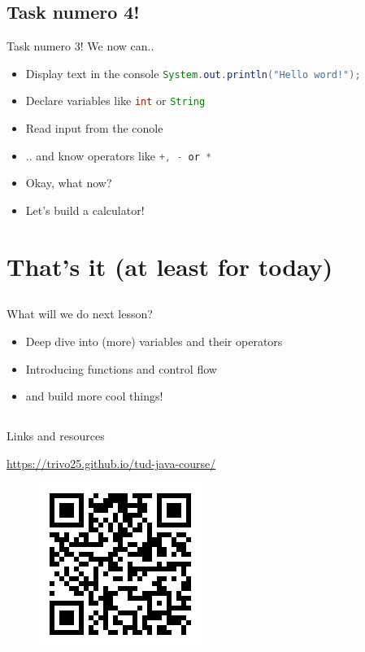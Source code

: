 \subsection{Task numero 4!}
\begin{frame}[fragile]{Task numero 3!}
	We now can..
	\begin{itemize}[<+->]
		\item Display text in the console \lstinline[language=Java]{System.out.println("Hello word!");}
		\item Declare variables like \lstinline[language=Java]{int} or \lstinline[language=Java]{String}
		\item Read input from the conole
		\item .. and know operators like \lstinline[language=Java]{+, - or *}
		\item[] Okay, what now?
		\item[] Let's build a calculator!
	\end{itemize}
\end{frame}

\section{That's it (at least for today)}

\subsection{}
\begin{frame}{What will we do next lesson?}
	\begin{itemize}
		\item Deep dive into (more) variables and their operators
		\item Introducing functions and control flow
		\item and build more cool things!
	\end{itemize}
\end{frame}

\subsection{}
\begin{frame}{Links and resources}
	\begin{center}
		\url{https://trivo25.github.io/tud-java-course/}
	\end{center}

	\begin{figure}[htbp]
		\centerline{\includegraphics{assets/qr.png}}
		\label{fig}
	\end{figure}
\end{frame}


